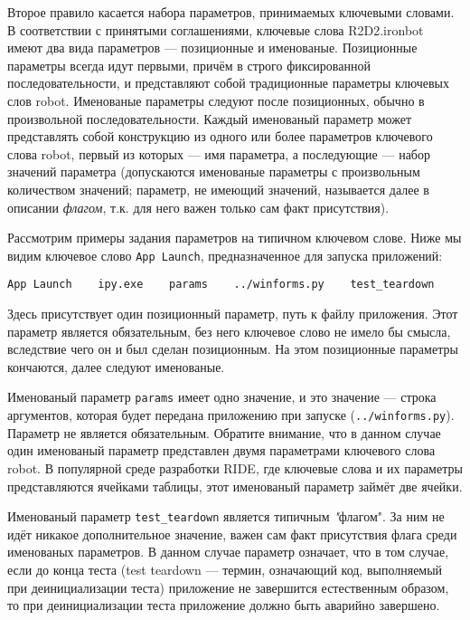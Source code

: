 \documentclass[11pt]{book} %
\begin{document}
Второе правило касается набора параметров, принимаемых ключевыми словами. В соответствии с принятыми соглашениями, ключевые слова R2D2.ironbot имеют два вида параметров --- позиционные и именованые. Позиционные параметры всегда идут первыми, причём в строго фиксированной последовательности, и представляют собой традиционные параметры ключевых слов robot. Именованые параметры следуют после позиционных, обычно в произвольной последовательности. Каждый именованый параметр может представлять собой конструкцию из одного или более параметров ключевого слова robot, первый из которых --- имя параметра, а последующие --- набор значений параметра (допускаются именованые параметры с произвольным количеством значений; параметр, не имеющий значений, называется далее в описании \emph{флагом}, т.к. для него важен только сам факт присутствия).

Рассмотрим примеры задания параметров на типичном ключевом слове. Ниже мы видим ключевое слово \verb"App Launch", предназначенное для запуска приложений:

\begin{verbatim}
App Launch    ipy.exe    params    ../winforms.py    test_teardown
\end{verbatim}

Здесь присутствует один позиционный параметр, путь к файлу приложения. Этот параметр является обязательным, без него ключевое слово не имело бы смысла, вследствие чего он и был сделан позиционным. На этом позиционные параметры кончаются, далее следуют именованые.

Именованый параметр \verb"params" имеет одно значение, и это значение --- строка аргументов, которая будет передана приложению при запуске (\verb"../winforms.py"). Параметр не является обязательным. Обратите внимание, что в данном случае один именованый параметр представлен двумя параметрами ключевого слова robot. В популярной среде разработки RIDE, где ключевые слова и их параметры представляются ячейками таблицы, этот именованый параметр займёт две ячейки.

Именованый параметр \verb"test_teardown" является типичным \emph"флагом". За ним не идёт никакое дополнительное значение, важен сам факт присутствия флага среди именованых параметров. В данном случае параметр означает, что в том случае, если до конца теста (test teardown --- термин, означающий код, выполняемый при деинициализации теста) приложение не завершится естественным образом, то при деинициализации теста приложение должно быть аварийно завершено.
\end{document}

